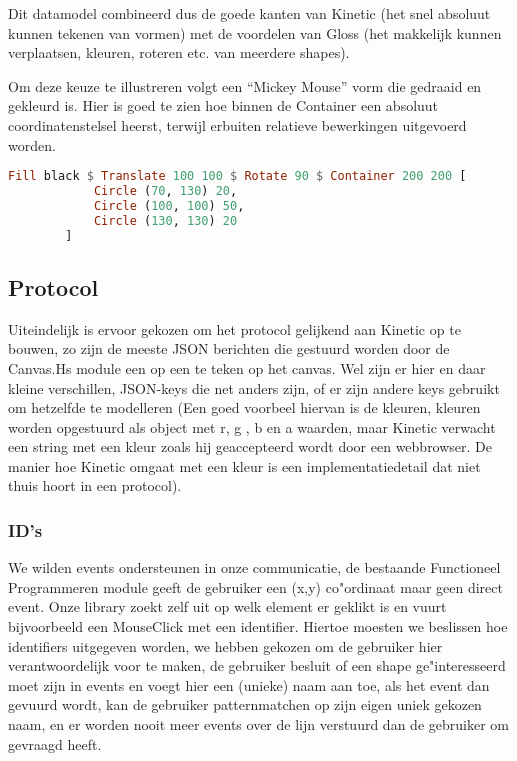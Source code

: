 Dit datamodel combineerd dus de goede kanten van Kinetic (het snel absoluut kunnen tekenen van vormen) met de voordelen van Gloss (het makkelijk kunnen verplaatsen, kleuren, roteren etc. van meerdere shapes).

Om deze keuze te illustreren volgt een ``Mickey Mouse'' vorm die gedraaid en gekleurd is. Hier is goed te zien hoe binnen de Container een absoluut coordinatenstelsel heerst, terwijl erbuiten relatieve bewerkingen uitgevoerd worden.

\begin{lstlisting}[style=densecode, language=Haskell]
Fill black $ Translate 100 100 $ Rotate 90 $ Container 200 200 [
            Circle (70, 130) 20,
            Circle (100, 100) 50,
            Circle (130, 130) 20
        ]
\end{lstlisting}

\subsection{Protocol}
Uiteindelijk is ervoor gekozen om het protocol gelijkend aan Kinetic op te bouwen, zo zijn de meeste JSON berichten die gestuurd worden door de Canvas.Hs module een op een te teken op het canvas. Wel zijn er hier en daar kleine verschillen, JSON-keys die net anders zijn, of er zijn andere keys gebruikt om hetzelfde te modelleren (Een goed voorbeel hiervan is de kleuren, kleuren worden opgestuurd als object met r, g , b en a waarden, maar Kinetic verwacht een string met een kleur zoals hij geaccepteerd wordt door een webbrowser. De manier hoe Kinetic omgaat met een kleur is een implementatiedetail dat niet thuis hoort in een protocol).

\subsubsection{ID's}

We wilden events ondersteunen in onze communicatie, de bestaande Functioneel Programmeren module geeft de gebruiker een (x,y) co"ordinaat maar geen direct event. Onze library zoekt zelf uit op welk element er geklikt is en vuurt bijvoorbeeld een MouseClick met een identifier. Hiertoe moesten we beslissen hoe identifiers uitgegeven worden, we hebben gekozen om de gebruiker hier verantwoordelijk voor te maken, de gebruiker besluit of een shape ge"interesseerd moet zijn in events en voegt hier een (unieke) naam aan toe, als het event dan gevuurd wordt, kan de gebruiker patternmatchen op zijn eigen uniek gekozen naam, en er worden nooit meer events over de lijn verstuurd dan de gebruiker om gevraagd heeft.

